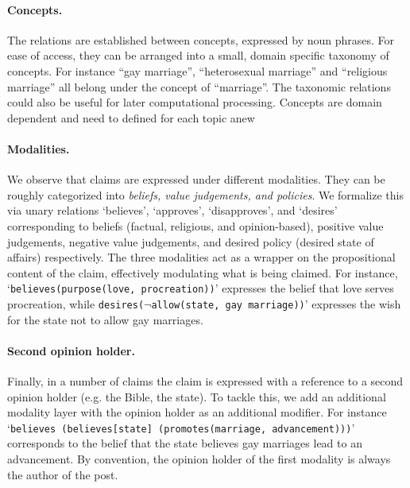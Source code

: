 \paragraph{Concepts. }
The relations are established between concepts, expressed by noun phrases. 
For ease of access, they can be arranged into a small, domain specific taxonomy of concepts. 
For instance ``gay marriage'', ``heterosexual marriage'' and ``religious marriage''
all belong under the concept of ``marriage''. 
The taxonomic relations could also be useful for later computational processing. 
Concepts are domain dependent and need to defined for each topic anew

\paragraph{Modalities. }
We observe that claims are expressed under different modalities. 
They can be roughly categorized into \textit{beliefs, value judgements, and policies}. 
We formalize this via unary relations `believes', `approves', `disapproves',
and `desires' corresponding 
to beliefs (factual, religious, and opinion-based), positive value judgements, negative value 
judgements, and desired policy (desired state of affairs) respectively. 
The three modalities act as a wrapper on the propositional content of the claim, 
effectively modulating what is being claimed. 
For instance, `\texttt{believes(purpose(love, procreation))}' expresses the belief 
that love serves procreation, while \texttt{desires(}$\neg$\texttt{allow(state, gay marriage))}'
expresses the wish for the state not to allow gay marriages. 

\paragraph{Second opinion holder. }
Finally, in a number of claims the claim is expressed with a reference to a second
opinion holder (e.g. the Bible, the state). 
To tackle this, we add an additional modality layer with the opinion holder as
an additional modifier. 
For instance `\texttt{believes (believes[state] (promotes(marriage, advancement)))}' corresponds
to the belief that the state believes gay marriages lead to an advancement. 
By convention, the opinion holder of the first modality is always the author of the post. 

